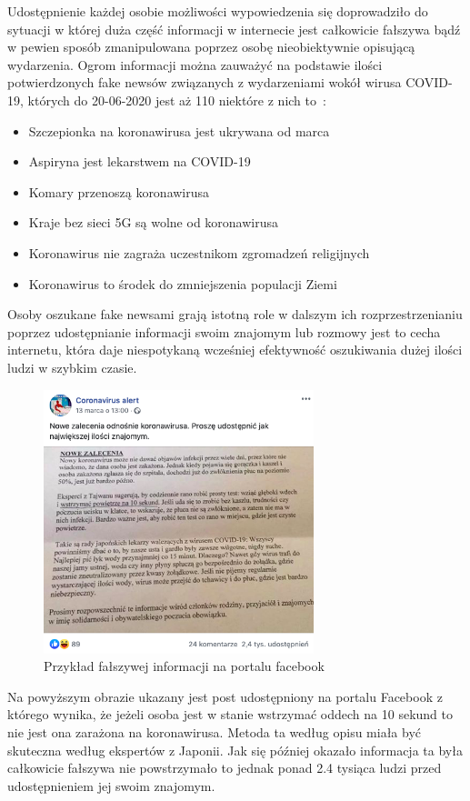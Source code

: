 Udostępnienie każdej osobie możliwości wypowiedzenia się doprowadziło do sytuacji w której duża część informacji w internecie
jest całkowicie fałszywa bądź w pewien sposób zmanipulowana poprzez osobę nieobiektywnie opisującą wydarzenia. Ogrom informacji
można zauważyć na podstawie ilości potwierdzonych fake newsów związanych z wydarzeniami wokół wirusa COVID-19, których do 
20-06-2020 jest aż 110 niektóre z nich to~\cite{Korona}:
\begin{itemize}
    \item Szczepionka na koronawirusa jest ukrywana od marca
    \item Aspiryna jest lekarstwem na COVID-19
    \item Komary przenoszą koronawirusa
    \item Kraje bez sieci 5G są wolne od koronawirusa 
    \item Koronawirus nie zagraża uczestnikom zgromadzeń religijnych
    \item Koronawirus to środek do zmniejszenia populacji Ziemi
\end{itemize}
Osoby oszukane fake newsami grają istotną role w dalszym ich rozprzestrzenianiu poprzez udostępnianie informacji swoim znajomym 
lub rozmowy jest to cecha internetu, która daje niespotykaną wcześniej efektywność oszukiwania dużej ilości ludzi w szybkim
czasie. 
\begin{figure}[h!]
    \centering
    \includegraphics[width=0.7\textwidth]{./Img/cvfakenews.png}
    \caption{Przykład fałszywej informacji na portalu facebook}
\end{figure}

Na powyższym obrazie ukazany jest post udostępniony na portalu Facebook z którego wynika, że jeżeli osoba jest w stanie wstrzymać 
oddech na 10 sekund to nie jest ona zarażona na koronawirusa. Metoda ta według opisu miała być skuteczna według ekspertów 
z Japonii. Jak się później okazało informacja ta była całkowicie fałszywa nie powstrzymało to jednak ponad 2.4 tysiąca ludzi przed 
udostępnieniem jej swoim znajomym.~\cite{KoronaOddech} 

